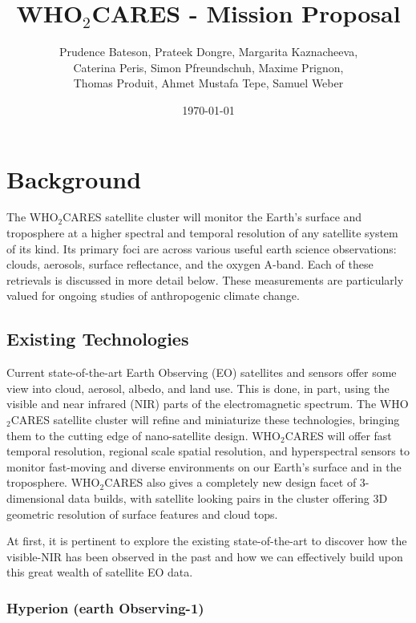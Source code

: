 \documentclass{scrartcl}
\author{Prudence Bateson, Prateek Dongre, Margarita Kaznacheeva,\\ Caterina Peris, Simon Pfreundschuh, Maxime Prignon,\\  Thomas Produit, Ahmet Mustafa Tepe, Samuel Weber}
\date{\today}
\title{WHO$_2$CARES - Mission Proposal}
\newcommand{\whocares}{WHO$_2$CARES }
\begin{document}
\maketitle

\section{Background}
\label{sec:org1347442}

The \whocares satellite cluster will monitor the Earth’s surface and troposphere
at a higher spectral and temporal resolution of any satellite system of its
kind. Its primary foci are across various useful earth science observations:
clouds, aerosols, surface reflectance, and the oxygen A-band. Each of these
retrievals is discussed in more detail below. These measurements are
particularly valued for ongoing studies of anthropogenic climate change.

\subsection{Existing Technologies}
\label{sec:org43b3706}

Current state-of-the-art Earth Observing (EO) satellites
and sensors offer some view into cloud, aerosol, albedo, and land use. This is
done, in part, using the visible and near infrared (NIR) parts of the
electromagnetic spectrum. The \whocares satellite cluster will refine and
miniaturize these technologies, bringing them to the cutting edge of
nano-satellite design. \whocares will offer fast temporal resolution, regional
scale spatial resolution, and hyperspectral sensors to monitor fast-moving and
diverse environments on our Earth’s surface and in the troposphere. \whocares
also gives a completely new design facet of 3-dimensional data builds, with
satellite looking pairs in the cluster offering 3D geometric resolution of
surface features and cloud tops.

At first, it is pertinent to explore the existing state-of-the-art to discover
how the visible-NIR has been observed in the past and how we can effectively
build upon this great wealth of satellite EO data.

\subsubsection{Hyperion (earth Observing-1)}
\label{sec:org37e5de5}
\end{document}
